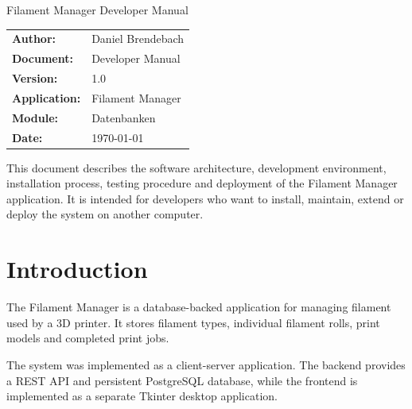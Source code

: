 \documentclass[a4paper,11pt]{article}
\begin{document}


\thispagestyle{empty}

\thgaTitel
  {Filament Manager}
  {Developer Manual}

\vspace{0.8cm}

\begin{tabularx}{\linewidth}{@{}lX@{}}
\textbf{Author:}      & Daniel Brendebach \\
\textbf{Document:}    & Developer Manual \\
\textbf{Version:}     & 1.0 \\
\textbf{Application:} & Filament Manager \\
\textbf{Module:}      & Datenbanken \\
\textbf{Date:}        & \today \\
\end{tabularx}

\vfill

\begin{infobox}
This document describes the software architecture, development environment,
installation process, testing procedure and deployment of the Filament
Manager application. It is intended for developers who want to install,
maintain, extend or deploy the system on another computer.
\end{infobox}

\newpage


\tableofcontents

\newpage

\section{Introduction}

The Filament Manager is a database-backed application for managing filament
used by a 3D printer. It stores filament types, individual filament rolls,
print models and completed print jobs.

The system was implemented as a client-server application. The backend
provides a REST API and persistent PostgreSQL database, while the frontend is
implemented as a separate Tkinter desktop application.
\end{document}
